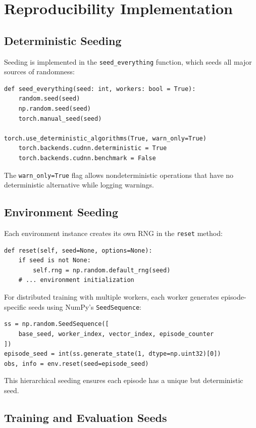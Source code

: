 \documentclass[english,bachelor]{hsluthesis}
\begin{document}
\section{Reproducibility Implementation}

\subsection{Deterministic Seeding}

Seeding is implemented in the \texttt{seed\_everything} function, which seeds all major sources of randomness:

\begin{verbatim}
def seed_everything(seed: int, workers: bool = True):
    random.seed(seed)
    np.random.seed(seed)
    torch.manual_seed(seed)

torch.use_deterministic_algorithms(True, warn_only=True)
    torch.backends.cudnn.deterministic = True
    torch.backends.cudnn.benchmark = False
\end{verbatim}

The \texttt{warn\_only=True} flag allows nondeterministic operations that have no deterministic alternative while logging warnings.

\subsection{Environment Seeding}

Each environment instance creates its own RNG in the \texttt{reset} method:

\begin{verbatim}
def reset(self, seed=None, options=None):
    if seed is not None:
        self.rng = np.random.default_rng(seed)
    # ... environment initialization
\end{verbatim}

For distributed training with multiple workers, each worker generates episode-specific seeds using NumPy's \texttt{SeedSequence}:

\begin{verbatim}
ss = np.random.SeedSequence([
    base_seed, worker_index, vector_index, episode_counter
])
episode_seed = int(ss.generate_state(1, dtype=np.uint32)[0])
obs, info = env.reset(seed=episode_seed)
\end{verbatim}

This hierarchical seeding ensures each episode has a unique but deterministic seed.

\subsection{Training and Evaluation Seeds}
\end{document}
